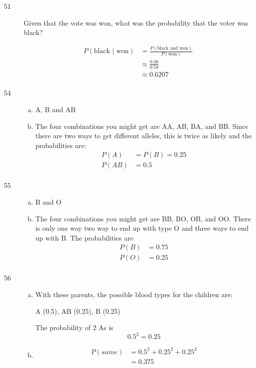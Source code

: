 \documentclass[letterpaper]{exam}
\begin{document}
\begin{description}
    \item[51]
      Given that the vote was won, what was the probability that the voter was black?

      \begin{align*}
        P(\text{black } | \text{ won}) & = \frac{P(\text{black and won})}{P(\text{won})} \\
                       & \approx \frac{0.36}{0.58} \\
                       & \approx \boxed{ 0.6207 } \\
      \end{align*}

    \item[54]
      \begin{enumerate}[(a)]
        \item A, B and AB

        \item
          The four combinations you might get are AA, AB, BA, and BB\@. Since there are 
          two ways to get different alleles, this is twice as likely and the probabilities
          are:
          \begin{align*}
            P(A)  & = P(B) = 0.25 \\
            P(AB) & = 0.5 \\
          \end{align*}
      \end{enumerate}

    \item[55]
      \begin{enumerate}[(a)]
        \item B and O

        \item
          The four combinations you might get are BB, BO, OB, and OO\@. There is
          only one way two way to end up with type O and three ways to end up
          with B. The probabilities are
          \begin{align*}
            P(B) & = 0.75 \\
            P(O) & = 0.25 \\
          \end{align*}
      \end{enumerate}

    \item[56]
      \begin{enumerate}[(a)]
        \item 
          With these parents, the possible blood types for the children are: 
          
          A (0.5), AB (0.25), B (0.25)

          The probability of 2 As is 
          \[
            0.5^2 = \boxed{ 0.25 }
          \]

        \item 
          \begin{align*}
            P(same) & = 0.5^2 + 0.25^2 + 0.25^2 \\
                    & = \boxed{ 0.375 }
          \end{align*}
      \end{enumerate}
  \end{description}
\end{document}
